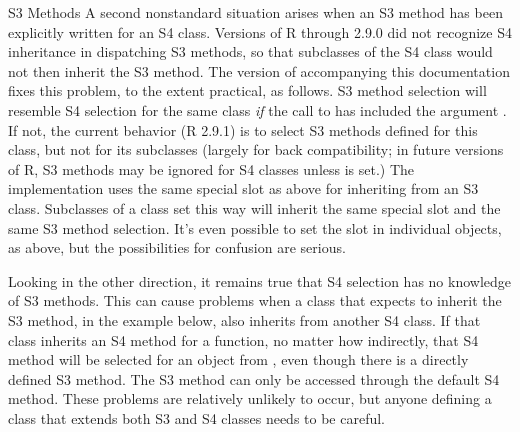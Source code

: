 \begin{Section}{S3 Methods}
A second nonstandard situation arises when an S3 method has been
explicitly written for an S4 class.
Versions of R through 2.9.0 did not recognize S4
inheritance in dispatching S3 methods, so that subclasses of the S4 class
would not then inherit the S3 method.  The version of \R{} accompanying this documentation
fixes this problem, to the extent practical, as follows.
S3 method selection will
resemble S4 selection for the same class \emph{if} the call to
 has included the argument . If not, the current behavior (R 2.9.1) is to select S3 methods
defined for this class, but not for its subclasses  (largely for back compatibility; in future versions of R, S3 methods may be
ignored for S4 classes unless  is set.)
The implementation uses the same special slot as above for inheriting
from an S3 class.  Subclasses of a class set this way will inherit the
same special slot and the same S3 method selection.
It's even possible to set the slot in individual objects, as above,
but the possibilities for confusion are serious.


Looking in the other direction, it remains true that S4 selection has no
knowledge of S3 methods.
This can cause problems when a class that expects to inherit
the S3 method,  in the example below, also inherits from another S4
class.  If that class inherits an S4 method for a function, no matter how
indirectly, that S4 method will be selected for an object from
, even though there is a directly defined S3 method.
The S3 method can only be accessed through the default S4 method.
These problems are relatively unlikely to occur, but anyone defining a
class that extends both S3 and S4 classes needs to be careful.

\end{Section}
%
